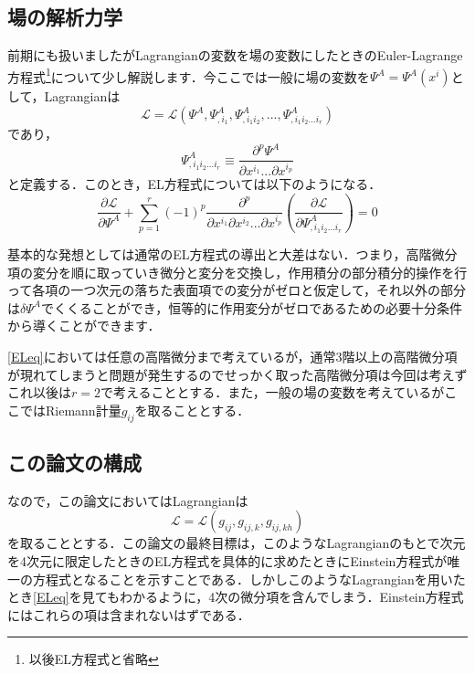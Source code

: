 \documentclass[12pt, a4paper]{jsarticle}
\begin{document}
\subsection{場の解析力学}
前期にも扱いましたがLagrangianの変数を場の変数にしたときのEuler-Lagrange方程式\footnote{以後EL方程式と省略}について少し解説します．今ここでは一般に場の変数を\(\Psi^A = \Psi^A(x^i)\)として，Lagrangianは
\begin{equation*}
  \mathscr{L} = \mathscr{L}( \Psi ^A, \Psi ^A _{,i_1}, \Psi ^A _{,i_1 i_2}, ... , \Psi ^A _{,i_1 i_2 ... i_r})
\end{equation*}
であり，
\begin{equation*}
  \Psi ^A _{,i_1 i_2 ... i_r} \equiv \dfrac{\partial ^p \Psi^A}{\partial x^{i_1} ...\partial x^{i_p}}
\end{equation*}
と定義する．このとき，EL方程式については以下のようになる．
\begin{equation*}
  \dfrac{\partial \mathscr{L}}{\partial \Psi^A} + \sum ^r _{p=1} (-1)^p \dfrac{\partial ^p}{\partial x^{i_1}\partial x^{i_2} ... \partial x^{i_p}}\left( \dfrac{\partial \mathscr{L}}{\partial \Psi ^A _{,i_1 i_2 ... i_r}} \right) =0 \tag{1.2} \label{ELeq}
\end{equation*}

基本的な発想としては通常のEL方程式の導出と大差はない．つまり，高階微分項の変分を順に取っていき微分と変分を交換し，作用積分の部分積分的操作を行って各項の一つ次元の落ちた表面項での変分がゼロと仮定して，それ以外の部分は\(\delta \Psi ^A\)でくくることができ，恒等的に作用変分がゼロであるための必要十分条件から導くことができます．

\eqref{ELeq}においては任意の高階微分まで考えているが，通常3階以上の高階微分項が現れてしまうと問題が発生するのでせっかく取った高階微分項は今回は考えずこれ以後は\(r=2\)で考えることとする．また，一般の場の変数を考えているがここではRiemann計量\(g_{ij}\)を取ることとする．

\subsection{この論文の構成}
なので，この論文においてはLagrangianは
\begin{equation}
  \mathscr{L} = \mathscr{L}(g_{ij}, g_{ij,k}, g_{ij,kh})
  \tag{1.3} \label{lag1}
\end{equation}
を取ることとする．この論文の最終目標は，このようなLagrangianのもとで次元を4次元に限定したときのEL方程式を具体的に求めたときにEinstein方程式が唯一の方程式となることを示すことである．しかしこのようなLagrangianを用いたとき\eqref{ELeq}を見てもわかるように，4次の微分項を含んでしまう．Einstein方程式にはこれらの項は含まれないはずである．
\end{document}
